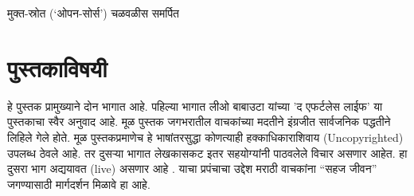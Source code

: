 \begin{dedication}
मुक्त-स्रोत (`ओपन-सोर्स') चळवळीस  समर्पित  
\end{dedication}

\clearpage

\chapter*{पुस्तकाविषयी}
हे पुस्तक प्रामुख्याने दोन भागात आहे.  पहिल्या भागात लीओ बाबाउटा यांच्या 'द एफर्टलेस लाईफ' या पुस्तकाचा स्वैर अनुवाद आहे.  मूळ पुस्तक जगभरातील वाचकांच्या मदतीने इंग्रजीत सार्वजनिक पद्धतीने लिहिले गेले होते.  मूळ पुस्तकप्रमाणेच  हे भाषांतरसुद्धा  कोणत्याही हक्काधिकाराशिवाय (Uncopyrighted) उपलब्ध ठेवले आहे.  तर दुसऱ्या भागात लेखकासकट इतर सहयोग्यांनी पाठवलेले विचार असणार आहेत.  हा दुसरा भाग अद्ययावत (live) असणार आहे .  याचा प्रपंचाचा उद्देश मराठी वाचकांना ``सहज जीवन'' जगण्यासाठी मार्गदर्शन मिळावे हा आहे. 
